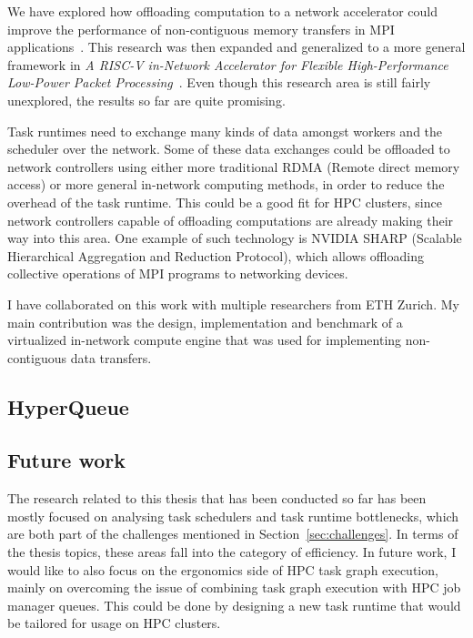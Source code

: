 We have explored how offloading computation to a network accelerator could improve the
performance of non-contiguous memory transfers in MPI applications~\cite{spin}. This
research was then expanded and generalized to a more general framework in \emph{A RISC-V in-Network
Accelerator for Flexible High-Performance Low-Power Packet Processing}~\cite{spin2}. Even though
this research area is still fairly unexplored, the results so far are quite promising.

Task runtimes need to exchange many kinds of data amongst workers and the scheduler over
the network. Some of these data exchanges could be offloaded to network controllers using either
more traditional RDMA (Remote direct memory access) or more general in-network computing
methods, in order to reduce the overhead of the task runtime. This could be a good fit for HPC
clusters, since network controllers capable of offloading computations are already making their
way into this area. One example of such technology is NVIDIA SHARP (Scalable Hierarchical
Aggregation and Reduction Protocol), which allows offloading collective operations of MPI
programs to networking devices.

I have collaborated on this work with multiple researchers from ETH Zurich. My main
contribution was the design, implementation and benchmark of a virtualized in-network compute
engine that was used for implementing non-contiguous data transfers.

\subsection{HyperQueue}


\subsection{Future work}
The research related to this thesis that has been conducted so far has been mostly focused on
analysing task schedulers and task runtime bottlenecks, which are both part of the
challenges mentioned in Section~\ref{sec:challenges}. In terms of the thesis topics, these areas
fall into the category of efficiency. In future work, I would like to also focus on the
ergonomics side of HPC task graph execution, mainly on overcoming the issue of combining task
graph execution with HPC job manager queues. This could be done by designing a new task runtime
that would be tailored for usage on HPC clusters.
